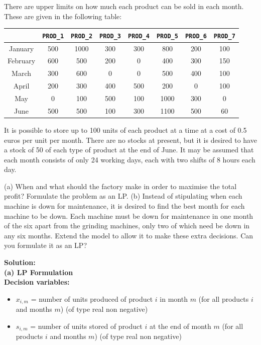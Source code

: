 \documentclass[a4paper,10pt]{article}
\begin{document}
There are upper limits on how much each product can be sold in each month. These are given
in the following table:


\begin{center}
\begin{tabular}{|c|c|c|c|c|c|c|c|}
\hline
& \texttt{PROD\_1} & \texttt{PROD\_2} & \texttt{PROD\_3} & \texttt{PROD\_4} & \texttt{PROD\_5} & \texttt{PROD\_6} & \texttt{PROD\_7} \\
\hline
January & 500 & 1000 & 300 & 300 & 800 & 200 & 100 \\
\hline
February & 600 & 500 & 200 & 0 & 400 & 300 & 150 \\
\hline
March & 300 & 600 & 0 & 0 & 500 & 400 & 100 \\
\hline
April & 200 & 300 & 400 & 500 & 200 & 0 & 100 \\
\hline
May & 0 & 100 & 500 & 100 & 1000 & 300 & 0 \\
\hline
June & 500 & 500 & 100 & 300 & 1100 & 500 & 60 \\
\hline
\end{tabular}
\end{center}

It is possible to store up to 100 units of each product at a time at a cost of 0.5 euros per unit per
month. There are no stocks at present, but it is desired to have a stock of 50 of each type of
product at the end of June.
It may be assumed that each month consists of only 24 working days, each with two shifts of 8
hours each day.

(a) When and what should the factory make in order to maximise the total profit? Formulate
the problem as an LP.
(b) Instead of stipulating when each machine is down for maintenance, it is desired to find the
best month for each machine to be down. Each machine must be down for maintenance in
one month of the six apart from the grinding machines, only two of which need be down
in any six months. Extend the model to allow it to make these extra decisions. Can you
formulate it as an LP?

\textbf{Solution:}\\

\textbf{(a) LP Formulation}\\

\textbf{Decision variables:}
\begin{itemize}
  \item \(x_{i,m}\) = number of units produced of product \(i\) in month \(m\) (for all products \(i\) and months \(m\)) (of type real non negative)
  \item \(s_{i,m}\) = number of units stored of product \(i\) at the end of month \(m\) (for all products \(i\) and months \(m\)) (of type real non negative)
\end{itemize}
\end{document}
